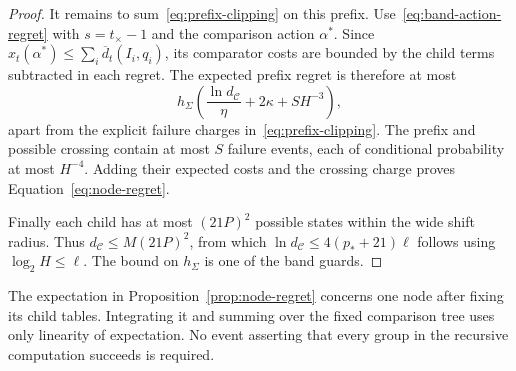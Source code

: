 \begin{proof}
It remains to sum~\eqref{eq:prefix-clipping} on this prefix.
Use~\eqref{eq:band-action-regret} with $s=t_\times-1$ and the
comparison action $\alpha^*$.  Since
$x_t(\alpha^*)\le\sum_i\overline d_t(I_i,q_i)$, its comparator costs
are bounded by the child terms subtracted in each regret.  The expected
prefix regret is therefore at most
\[
 h_\Sigma\left(\frac{\ln d_{\mathcal C}}{\eta}
                  +2\kappa+SH^{-3}\right),
\]
apart from the explicit failure charges in~\eqref{eq:prefix-clipping}.
The prefix and possible crossing contain at most $S$ failure events,
each of conditional probability at most $H^{-4}$. Adding their expected
costs and the crossing charge proves Equation~\ref{eq:node-regret}.

Finally each child has at most $(21P)^2$ possible states within the wide
shift radius. Thus $d_{\mathcal C}\le M(21P)^2$, from which
$\ln d_{\mathcal C}\le4(p_*+21)\ell$ follows using
$\log_2 H\le\ell$. The bound on $h_\Sigma$ is one of the band guards.
\end{proof}

The expectation in Proposition~\ref{prop:node-regret} concerns one node
after fixing its child tables. Integrating it and summing over the fixed
comparison tree uses only linearity of expectation. No event asserting
that every group in the recursive computation succeeds is required.
